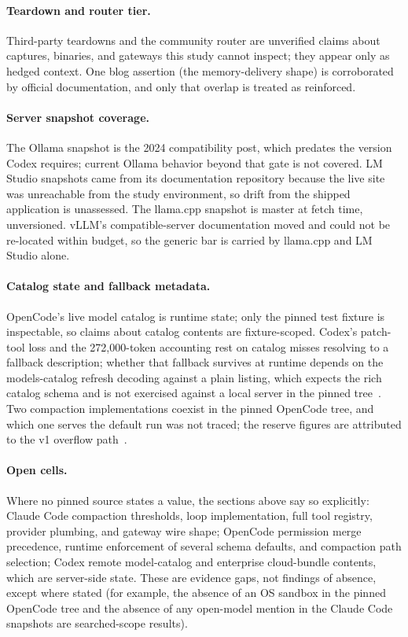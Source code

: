 \documentclass{article}
\newcommand{\codex}[0]{Codex}
\newcommand{\occ}[0]{OpenCode}
\newcommand{\ccc}[0]{Claude Code}
\begin{document}
\paragraph{Teardown and router tier.} Third-party teardowns and the
community router are unverified claims about captures, binaries, and
gateways this study cannot inspect; they appear only as hedged context.
One blog assertion (the memory-delivery shape) is corroborated by
official documentation, and only that overlap is treated as reinforced.

\paragraph{Server snapshot coverage.} The Ollama snapshot is the 2024
compatibility post, which predates the version \codex{} requires;
current Ollama behavior beyond that gate is not covered. LM Studio
snapshots came from its documentation repository because the live site
was unreachable from the study environment, so drift from the shipped
application is unassessed. The llama.cpp snapshot is master at fetch
time, unversioned. vLLM's compatible-server documentation moved and could
not be re-located within budget, so the generic bar is carried by
llama.cpp and LM Studio alone.

\paragraph{Catalog state and fallback metadata.} \occ{}'s live model
catalog is runtime state; only the pinned test fixture is inspectable, so
claims about catalog contents are fixture-scoped. \codex{}'s patch-tool
loss and the 272{,}000-token accounting rest on catalog misses resolving
to a fallback description; whether that fallback survives at runtime
depends on the models-catalog refresh decoding against a plain
 listing, which expects the rich catalog schema and is
not exercised against a local server in the pinned
tree~\citep{codexRepo,opencodeRepo}. Two compaction implementations
coexist in the pinned \occ{} tree, and which one serves the default run
was not traced; the reserve figures are attributed to the v1 overflow
path~\citep{opencodeRepo}.

\paragraph{Open cells.} Where no pinned source states a value, the
sections above say so explicitly: \ccc{} compaction thresholds, loop
implementation, full tool registry, provider plumbing, and gateway wire
shape; \occ{} permission merge precedence, runtime enforcement of several
schema defaults, and compaction path selection; \codex{} remote
model-catalog and enterprise cloud-bundle contents, which are server-side
state. These are evidence gaps, not findings of absence, except where
stated (for example, the absence of an OS sandbox in the pinned \occ{}
tree and the absence of any open-model mention in the \ccc{} snapshots
are searched-scope results).
\end{document}
